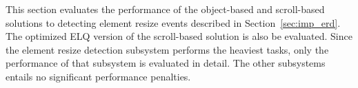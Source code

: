 \documentclass[a4paper,11pt]{kth-mag}
\begin{document}
      
        This section evaluates the performance of the object-based and scroll-based solutions to detecting \gls{element} resize events described in Section~\ref{sec:imp_erd}.
        The optimized \gls{ELQ} version of the scroll-based solution is also be evaluated.
        Since the element resize detection subsystem performs the heaviest tasks, only the performance of that subsystem is evaluated in detail.
        The other subsystems entails no significant performance penalties.
\end{document}
